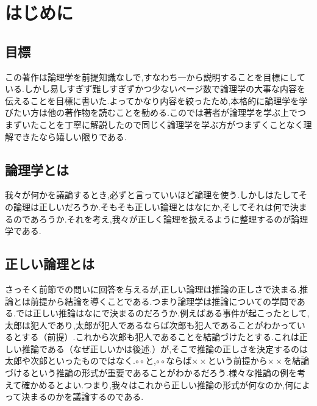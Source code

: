 \documentclass[10pt,b5paper,papersize,dvipdfmx]{jsbook}
\begin{document}
\section{はじめに}
\subsection{目標}
この著作は論理学を前提知識なしで,すなわち一から説明することを目標にしている.しかし易しすぎず難しすぎずかつ少ないページ数で論理学の大事な内容を伝えることを目標に書いた.よってかなり内容を絞ったため,本格的に論理学を学びたい方は他の著作物を読むことを勧める.このでは著者が論理学を学ぶ上でつまずいたことを丁寧に解説したので同じく論理学を学ぶ方がつまずくことなく理解できたなら嬉しい限りである.

\subsection{論理学とは}
我々が何かを議論するとき,必ずと言っていいほど論理を使う.しかしはたしてその論理は正しいだろうか.そもそも正しい論理とはなにか,そしてそれは何で決まるのであろうか.それを考え,我々が正しく論理を扱えるように整理するのが論理学である.
\subsection{正しい論理とは}
さっそく前節での問いに回答を与えるが,正しい論理は推論の正しさで決まる.推論とは前提から結論を導くことである.つまり論理学は推論についての学問である.では正しい推論はなにで決まるのだろうか.例えばある事件が起こったとして,太郎は犯人であり,太郎が犯人であるならば次郎も犯人であることがわかっているとする（前提）.これから次郎も犯人であることを結論づけたとする.これは正しい推論である（なぜ正しいかは後述.）が,そこで推論の正しさを決定するのは太郎や次郎といったものではなく.$\circ \circ$と,$\circ \circ$ならば$\times \times$という前提から$\times \times$を結論づけるという推論の形式が重要であることがわかるだろう.様々な推論の例を考えて確かめるとよい.つまり,我々はこれから正しい推論の形式が何なのか,何によって決まるのかを議論するのである.
\end{document}

